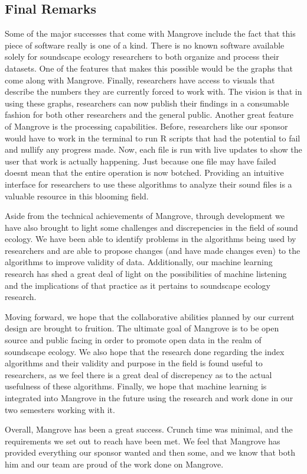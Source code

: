 \subsection{Final Remarks}
Some of the major successes that come with Mangrove include the fact that this piece of software really is one of a kind. There is no known software available solely for soundscape ecology researchers to both organize and process their datasets. One of the features that makes this possible would be the graphs that come along with Mangrove. Finally, researchers have access to visuals that describe the numbers they are currently forced to work with. The vision is that in using these graphs, researchers can now publish their findings in a consumable fashion for both other researchers and the general public. Another great feature of Mangrove is the processing capabilities. Before, researchers like our sponsor would have to work in the terminal to run R scripts that had the potential to fail and nullify any progress made. Now, each file is run with live updates to show the user that work is actually happening. Just because one file may have failed doesn\textquotesingle t mean that the entire operation is now botched. Providing an intuitive interface for researchers to use these algorithms to analyze their sound files is a valuable resource in this blooming field.\par
Aside from the technical achievements of Mangrove, through development we have also brought to light some challenges and discrepencies in the field of sound ecology. We have been able to identify problems in the algorithms being used by researchers and are able to propose changes (and have made changes even) to the algorithms to improve validity of data. Additionally, our machine learning research has shed a great deal of light on the possibilities of machine listening and the implications of that practice as it pertains to soundscape ecology research.\par
Moving forward, we hope that the collaborative abilities planned by our current design are brought to fruition. The ultimate goal of Mangrove is to be open source and public facing in order to promote open data in the realm of soundscape ecology. We also hope that the research done regarding the index algorithms and their validity and purpose in the field is found useful to researchers, as we feel there is a great deal of discrepency as to the actual usefulness of these algorithms. Finally, we hope that machine learning is integrated into Mangrove in the future using the research and work done in our two semesters working with it.\par
Overall, Mangrove has been a great success. Crunch time was minimal, and the requirements we set out to reach have been met. We feel that Mangrove has provided everything our sponsor wanted and then some, and we know that both him and our team are proud of the work done on Mangrove.\par
